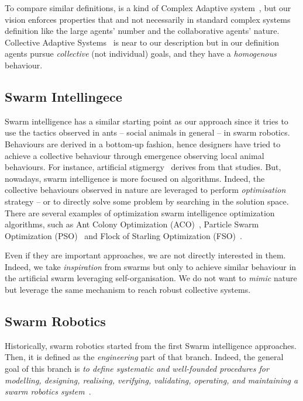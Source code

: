 \documentclass[11pt]{article}
\begin{document}
To compare similar definitions, \cpsw{} is a kind of Complex Adaptive system~\cite{holland1992complex}, but our vision enforces properties that and not necessarily in standard complex systems definition like the large agents' number and the collaborative agents' nature.
Collective Adaptive Systems~\cite{DBLP:journals/corr/abs-1108-5643} is near to our \cpsw{} description but in our definition agents pursue \emph{collective} (not individual) goals, and they have a \emph{homogenous} behaviour.
\subsection{Swarm Intellingece}
Swarm intelligence has a similar starting point as our approach since it tries to use the tactics observed in ants -- social animals in general -- in swarm robotics. Behaviours are derived in a bottom-up fashion, hence designers have tried to achieve a collective behaviour through emergence observing local animal behaviours.
%
For instance, artificial stigmergy~\cite{DBLP:journals/fgcs/DorigoBT00} derives from that studies. But, nowadays, swarm intelligence is more focused on algorithms. 
Indeed, the collective behaviours observed in nature are leveraged to perform \textit{optimisation} strategy -- or to directly solve some problem by searching in the solution space.
There are several examples of optimization swarm intelligence optimization algorithms,  such as Ant Colony Optimization (ACO)~\cite{DBLP:journals/tsmc/DorigoMC96}, Particle Swarm Optimization (PSO)~\cite{DBLP:conf/icnn/KennedyE95} and Flock of Starling Optimization (FSO)~\cite{DBLP:series/sci/FulgineiS11}.

Even if they are important approaches, we are not directly interested in them. Indeed, we take \textit{inspiration} from swarms but only to achieve similar behaviour in the artificial swarm leveraging self-organisation. We do not want to \textit{mimic} nature but leverage the same mechanism to reach robust collective systems.
\subsection{Swarm Robotics}
Historically, swarm robotics started from the first Swarm intelligence approaches. Then, it is defined as the \textit{engineering} part of that branch. Indeed, the general goal of this branch is \emph{to define systematic and well-founded procedures for modelling, designing, realising, verifying, validating, operating, and maintaining a swarm robotics system}~\cite{DBLP:journals/swarm/BrambillaFBD13}.
\end{document}
